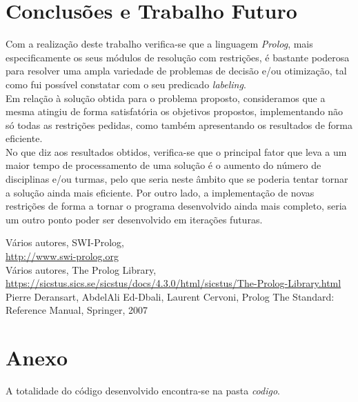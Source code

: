 \documentclass{llncs}
\begin{document}
\section{Conclusões e Trabalho Futuro}
Com a realização deste trabalho verifica-se que a linguagem \textit{Prolog}, mais especificamente os seus módulos de resolução com restrições, é bastante poderosa para resolver uma ampla variedade de problemas de decisão e/ou otimização, tal como fui possível constatar com o seu predicado \textit{labeling}.
\\Em relação à solução obtida para o problema proposto, consideramos que a mesma atingiu de forma satisfatória os objetivos propostos, implementando não só todas as restrições pedidas, como também apresentando os resultados de forma eficiente.
\\No que diz aos resultados obtidos, verifica-se que o principal fator que leva a um maior tempo de processamento de uma solução é o aumento do número de disciplinas e/ou turmas, pelo que seria neste âmbito que se poderia tentar tornar a solução ainda mais eficiente. Por outro lado, a implementação de novas restrições de forma a tornar o programa desenvolvido ainda mais completo, seria um outro ponto poder ser desenvolvido  em iterações futuras.




\begin{thebibliography}{5}
%
Vários autores, SWI-Prolog,\\
\url{http://www.swi-prolog.org}\\
Vários autores, The Prolog Library,\\
\url{https://sicstus.sics.se/sicstus/docs/4.3.0/html/sicstus/The-Prolog-Library.html}\\
Pierre Deransart, AbdelAli Ed-Dbali, Laurent Cervoni, Prolog The Standard: Reference Manual, Springer, 2007\\

\end{thebibliography}
\clearpage

\section*{Anexo}
A totalidade do código desenvolvido encontra-se na pasta \textit{codigo}.
\end{document}
